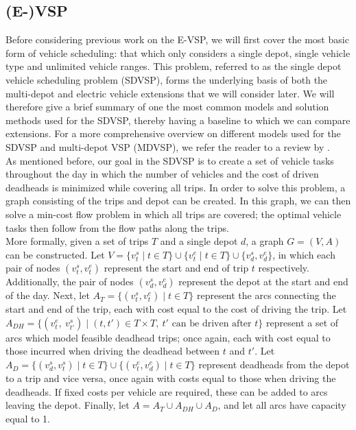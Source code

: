 \documentclass[]{article}
\begin{document}
\subsection{(E-)VSP}
Before considering previous work on the E-VSP, we will first cover the most basic form of vehicle scheduling: that which only considers a single depot, single vehicle type and unlimited vehicle ranges. This problem, referred to as the single depot vehicle scheduling problem (SDVSP), forms the underlying basis of both the multi-depot and electric vehicle extensions that we will consider later. We will therefore give a brief summary of one the most common models and solution methods used for the SDVSP, thereby having a baseline to which we can compare extensions. For a more comprehensive overview on different models used for the SDVSP and multi-depot VSP (MDVSP), we refer the reader to a review by \citet{Bunte2009}. \\
As mentioned before, our goal in the SDVSP is to create a set of vehicle tasks throughout the day in which the number of vehicles and the cost of driven deadheads is minimized while covering all trips. In order to solve this problem, a graph consisting of the trips and depot can be created. In this graph, we can then solve a min-cost flow problem in which all trips are covered; the optimal vehicle tasks then follow from the flow paths along the trips. \\
More formally, given a set of trips $T$ and a single depot $d$, a graph $G = (V, A)$ can be constructed. Let $V = \{ v^s_t \mid t \in T \} \cup \{ v^e_t \mid t \in T \} \cup \{ v^s_d, v^e_d \}$, in which each pair of nodes $(v^s_t, v^e_t)$ represent the start and end of trip $t$ respectively. Additionally, the pair of nodes $(v^s_d, v^e_d)$ represent the depot at the start and end of the day. Next, let $A_T = \{ (v^s_t, v^e_t) \mid t \in T \}$ represent the arcs connecting the start and end of the trip, each with cost equal to the cost of driving the trip. Let $A_{DH} = \{ ( v^e_t,\: v^s_{t'}) \mid (t, t') \in T \times T,\: t'\text{ can be driven after }t \}$ represent a set of arcs which model feasible deadhead trips; once again, each with cost equal to those incurred when driving the deadhead between $t$ and $t'$. Let $A_{D} = \{ (v^s_d, v^s_t) \mid t \in T \} \cup \{ (v^e_t, v_d^e) \mid t \in T \}$ represent deadheads from the depot to a trip and vice versa, once again with costs equal to those when driving the deadheads. If fixed costs per vehicle are required, these can be added to arcs leaving the depot. Finally, let $A = A_T \cup A_{DH} \cup A_D$, and let all arcs have capacity equal to 1. \\
\end{document}
